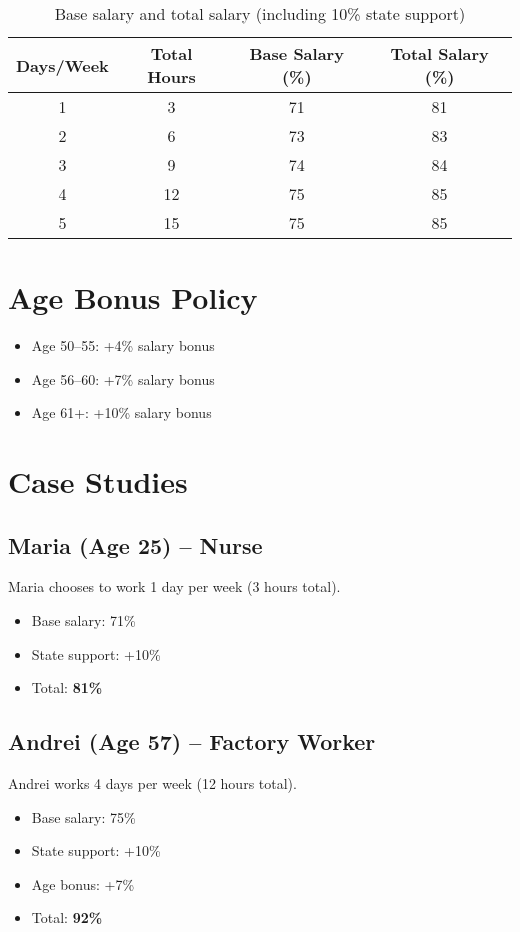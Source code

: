\documentclass[12pt]{article}
\begin{document}
\begin{table}[ht]
\centering
{}
\begin{tabular}{|c|c|c|c|}
\hline
\textbf{Days/Week} & \textbf{Total Hours} & \textbf{Base Salary (\%)} & \textbf{Total Salary (\%)} \\ \hline
1 & 3 & 71 & 81 \\ \hline
2 & 6 & 73 & 83 \\ \hline
3 & 9 & 74 & 84 \\ \hline
4 & 12 & 75 & 85 \\ \hline
5 & 15 & 75 & 85 \\ \hline
\end{tabular}
\caption{Base salary and total salary (including 10\% state support)}
\end{table}

\section{Age Bonus Policy}
\begin{itemize}
    \item Age 50–55: +4\% salary bonus
    \item Age 56–60: +7\% salary bonus
    \item Age 61+: +10\% salary bonus
\end{itemize}

\section{Case Studies}

\subsection{Maria (Age 25) – Nurse}
Maria chooses to work 1 day per week (3 hours total).
\begin{itemize}
    \item Base salary: 71\%
    \item State support: +10\%
    \item Total: \textbf{81\%}
\end{itemize}

\subsection{Andrei (Age 57) – Factory Worker}
Andrei works 4 days per week (12 hours total).
\begin{itemize}
    \item Base salary: 75\%
    \item State support: +10\%
    \item Age bonus: +7\%
    \item Total: \textbf{92\%}
\end{itemize}
\end{document}
